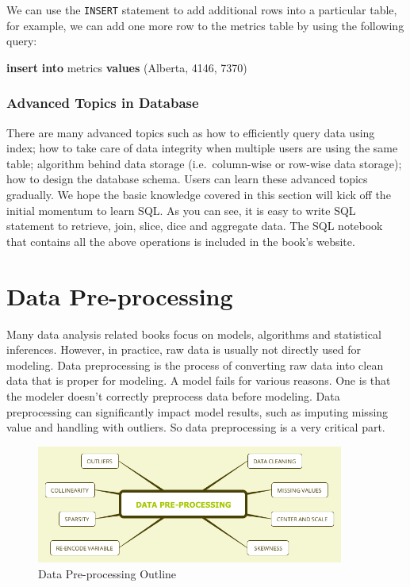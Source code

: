 \documentclass[
  12pt,
]{krantz}
\makeatletter
\newenvironment{Shaded}{\begin{snugshade}}{\end{snugshade}}
\newcommand{\DecValTok}[1]{\textcolor[rgb]{0.06,0.06,0.06}{#1}}
\newcommand{\KeywordTok}[1]{\textcolor[rgb]{0.27,0.27,0.27}{\textbf{#1}}}
\newcommand{\NormalTok}[1]{#1}
\newcommand{\StringTok}[1]{\textcolor[rgb]{0.5,0.5,0.5}{#1}}
\newenvironment{kframe}{%
\medskip{}
\setlength{\fboxsep}{.8em}
 \def\at@end@of@kframe{}%
 \ifinner\ifhmode%
  \def\at@end@of@kframe{\end{minipage}}%
  \begin{minipage}{\columnwidth}%
 \fi\fi%
 \def\FrameCommand##1{\hskip\@totalleftmargin \hskip-\fboxsep
 \colorbox{shadecolor}{##1}\hskip-\fboxsep
     \hskip-\linewidth \hskip-\@totalleftmargin \hskip\columnwidth}%
 \MakeFramed {\advance\hsize-\width
   \@totalleftmargin\z@ \linewidth\hsize
   \@setminipage}}%
 {\par\unskip\endMakeFramed%
 \at@end@of@kframe}
\renewenvironment{Shaded}{\begin{kframe}}{\end{kframe}}
\makeatother
\begin{document}
We can use the \texttt{INSERT} statement to add additional rows into a particular table, for example, we can add one more row to the metrics table by using the following query:

\begin{Shaded}
\begin{Highlighting}[]
\KeywordTok{insert} \KeywordTok{into}\NormalTok{ metrics}
\KeywordTok{values}\NormalTok{ (}\StringTok{\textquotesingle{}Alberta\textquotesingle{}}\NormalTok{, }\DecValTok{4146}\NormalTok{, }\DecValTok{7370}\NormalTok{)}
\end{Highlighting}
\end{Shaded}

\hypertarget{advanced-topics-in-database}{%
\subsection{Advanced Topics in Database}\label{advanced-topics-in-database}}

There are many advanced topics such as how to efficiently query data using index; how to take care of data integrity when multiple users are using the same table; algorithm behind data storage (i.e.~column-wise or row-wise data storage); how to design the database schema. Users can learn these advanced topics gradually. We hope the basic knowledge covered in this section will kick off the initial momentum to learn SQL. As you can see, it is easy to write SQL statement to retrieve, join, slice, dice and aggregate data. The SQL notebook that contains all the above operations is included in the book's website.

\hypertarget{datapreprocessing}{%
\chapter{Data Pre-processing}\label{datapreprocessing}}

Many data analysis related books focus on models, algorithms and statistical inferences. However, in practice, raw data is usually not directly used for modeling. Data preprocessing is the process of converting raw data into clean data that is proper for modeling. A model fails for various reasons. One is that the modeler doesn't correctly preprocess data before modeling. Data preprocessing can significantly impact model results, such as imputing missing value and handling with outliers. So data preprocessing is a very critical part.

\begin{figure}
\centering
\includegraphics[width=0.9\textwidth,height=\textheight]{images/DataPre-processing.png}
\caption{Data Pre-processing Outline}
\end{figure}
\end{document}
